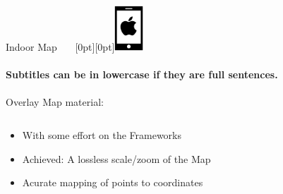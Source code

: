 \documentclass[11pt]{beamer}
\begin{document}
\begin{frame}{Indoor Map ~~~\raisebox{-10pt}[0pt][0pt]{\includegraphics[width=0.08\textwidth]{tech-stack-apple}}}

\framesubtitle{Subtitles can be in lowercase if they are full sentences.}
Overlay Map material:

  \begin{columns}[T]
  \begin{column}{.6\textwidth}
  \begin{itemize}
    \item With some effort on the Frameworks
    \item Achieved: A lossless scale/zoom of the Map
    \item Acurate mapping of points to coordinates
  \end{itemize}
  \end{column}
  \begin{column}{.4\textwidth}

\end{column}
\end{columns}
\end{frame}
\end{document}
